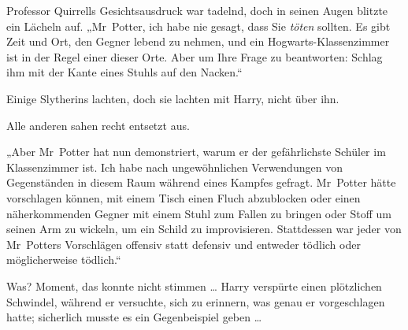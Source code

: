Professor Quirrells Gesichtsausdruck war tadelnd, doch in seinen Augen blitzte ein Lächeln auf.
„Mr~Potter, ich habe nie gesagt, dass Sie \emph{töten} sollten. Es gibt Zeit und Ort, den Gegner lebend zu nehmen, und ein Hogwarts-Klassenzimmer ist in der Regel einer dieser Orte. Aber um Ihre Frage zu beantworten: Schlag ihm mit der Kante eines Stuhls auf den Nacken.“

Einige Slytherins lachten, doch sie lachten mit Harry, nicht über ihn.

Alle anderen sahen recht entsetzt aus.

„Aber Mr~Potter hat nun demonstriert, warum er der gefährlichste Schüler im Klassenzimmer ist. Ich habe nach ungewöhnlichen Verwendungen von Gegenständen in diesem Raum während eines Kampfes gefragt. Mr~Potter hätte vorschlagen können, mit einem Tisch einen Fluch abzublocken oder einen näherkommenden Gegner mit einem Stuhl zum Fallen zu bringen oder Stoff um seinen Arm zu wickeln, um ein Schild zu improvisieren. Stattdessen war jeder von Mr~Potters Vorschlägen offensiv statt defensiv und entweder tödlich oder möglicherweise tödlich.“

Was? Moment, das konnte nicht stimmen … Harry verspürte einen plötzlichen Schwindel, während er versuchte, sich zu erinnern, was genau er vorgeschlagen hatte; sicherlich musste es ein Gegenbeispiel geben …

